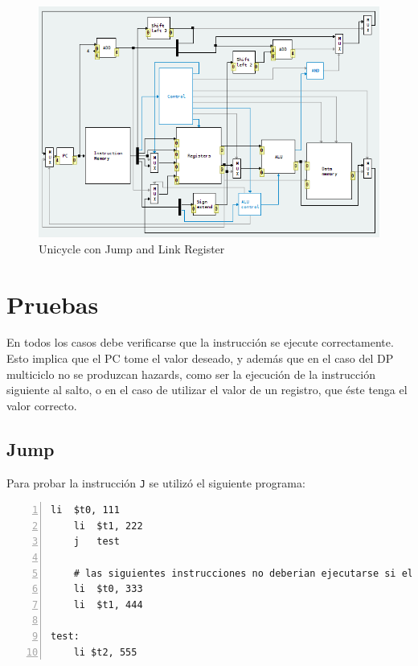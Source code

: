 \documentclass[11pt,a4paper, spanish]{article}
\begin{document}
\begin{figure}
\begin{center}
\includegraphics[width=\textwidth,height=\textheight,keepaspectratio]{img/unicycle_jalr.png}
\caption{Unicycle con Jump and Link Register}
\end{center}
\end{figure}

\pagebreak

\section{Pruebas}

En todos los casos debe verificarse que la instrucción se ejecute correctamente. Esto implica
que el PC tome el valor deseado, y además que en el caso del DP multiciclo no se produzcan
hazards, como ser la ejecución de la instrucción siguiente al salto, o en el caso de utilizar el valor
de un registro, que éste tenga el valor correcto.


\subsection{Jump}

Para probar la instrucción \texttt{J} se utilizó el siguiente programa:

\begin{lstlisting}[numbers=left, tabsize=2, basicstyle=\fontsize{11}{13}\ttfamily, frame=single, caption={Test j}]
	li	$t0, 111
	li	$t1, 222
	j	test

	# las siguientes instrucciones no deberian ejecutarse si el salto se realiza
	li	$t0, 333
	li	$t1, 444

test:
	li $t2, 555
\end{lstlisting}
\end{document}
